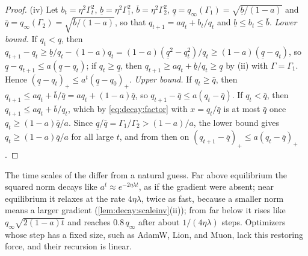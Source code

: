 \begin{refsection}
\begin{proof}
(iv) Let $b_t=\eta^2\Gamma_t^2$, $\underline b=\eta^2\Gamma_1^2$, $\bar b=\eta^2\Gamma_2^2$, $\underline q=q_\infty(\Gamma_1)=\sqrt{\underline b/(1-a)}$ and $\bar q=q_\infty(\Gamma_2)=\sqrt{\bar b/(1-a)}$, so that $q_{t+1}=aq_t+b_t/q_t$ and $\underline b\le b_t\le\bar b$. \emph{Lower bound.} If $q_t<\underline q$, then $q_{t+1}-q_t\ge\underline b/q_t-(1-a)q_t=(1-a)(\underline q^2-q_t^2)/q_t\ge(1-a)(\underline q-q_t)$, so $\underline q-q_{t+1}\le a(\underline q-q_t)$; if $q_t\ge\underline q$, then $q_{t+1}\ge aq_t+\underline b/q_t\ge\underline q$ by (ii) with $\Gamma=\Gamma_1$. Hence $(\underline q-q_t)_+\le a^t(\underline q-q_0)_+$. \emph{Upper bound.} If $q_t\ge\bar q$, then $q_{t+1}\le aq_t+\bar b/\bar q=aq_t+(1-a)\bar q$, so $q_{t+1}-\bar q\le a(q_t-\bar q)$. If $q_t<\bar q$, then $q_{t+1}\le aq_t+\bar b/q_t$, which by \eqref{eq:decay:factor} with $x=q_t/\bar q$ is at most $\bar q$ once $q_t\ge(1-a)\bar q/a$. Since $\underline q/\bar q=\Gamma_1/\Gamma_2>(1-a)/a$, the lower bound gives $q_t\ge(1-a)\bar q/a$ for all large $t$, and from then on $(q_{t+1}-\bar q)_+\le a(q_t-\bar q)_+$.
\end{proof}

The time scales of the  differ from a natural guess. Far above equilibrium the squared norm decays like $a^t\approx e^{-2\eta\lambda t}$, as if the gradient were absent; near equilibrium it relaxes at the rate $4\eta\lambda$, twice as fast, because a smaller norm means a larger gradient (\cref{lem:decay:scaleinv}(ii)); from far below it rises like $q_\infty\sqrt{2(1-a)t}$ and reaches $0.8\,q_\infty$ after about $1/(4\eta\lambda)$ steps. Optimizers whose step has a fixed size, such as AdamW, Lion, and Muon, lack this restoring force, and their recursion is linear.



\end{refsection}
